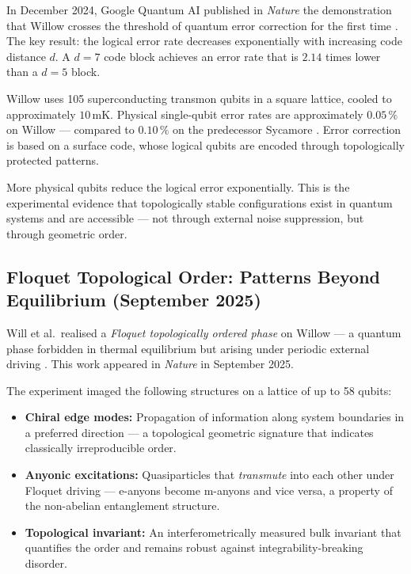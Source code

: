 In December 2024, Google Quantum AI published in \textit{Nature} the demonstration
that Willow crosses the threshold of quantum error correction for the first time
\cite{GoogleWillow2024}. The key result: the logical error rate decreases
exponentially with increasing code distance $d$. A $d=7$ code block achieves an
error rate that is $2.14$ times lower than a $d=5$ block.

Willow uses 105 superconducting transmon qubits in a square lattice, cooled to
approximately $10\,\text{mK}$. Physical single-qubit error rates are approximately
$0.05\,\%$ on Willow — compared to $0.10\,\%$ on the predecessor Sycamore
\cite{Will2025PubMed}. Error correction is based on a surface code, whose logical
qubits are encoded through topologically protected patterns.

\begin{keypoint}
More physical qubits reduce the logical error exponentially. This is the experimental
evidence that topologically stable configurations exist in quantum systems and are
accessible — not through external noise suppression, but through geometric order.
\end{keypoint}

\subsection{Floquet Topological Order: Patterns Beyond Equilibrium
(September 2025)}

Will et al.\ realised a \emph{Floquet topologically ordered phase} on Willow — a
quantum phase forbidden in thermal equilibrium but arising under periodic external
driving \cite{Will2025Nature}. This work appeared in \textit{Nature} in September 2025.

\begin{keyresult}
The experiment imaged the following structures on a lattice of up to 58 qubits:
\begin{itemize}
    \item \textbf{Chiral edge modes:} Propagation of information along system
    boundaries in a preferred direction — a topological geometric signature that
    indicates classically irreproducible order.
    \item \textbf{Anyonic excitations:} Quasiparticles that \emph{transmute} into
    each other under Floquet driving — e-anyons become m-anyons and vice versa,
    a property of the non-abelian entanglement structure.
    \item \textbf{Topological invariant:} An interferometrically measured bulk
    invariant that quantifies the order and remains robust against
    integrability-breaking disorder.
\end{itemize}
\end{keyresult}

